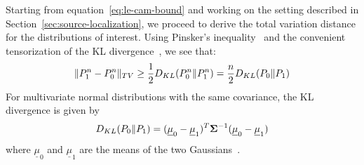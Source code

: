 \documentclass[conference]{IEEEtran}
\providecommand{\v}{}
\renewcommand{\v}[1]{\underline{#1}}
\providecommand{\m}{}
\renewcommand{\m}[1]{{\bf #1}}
\DeclarePairedDelimiter\norm{\lVert}{\rVert}
\begin{document}
\begin{IEEEproof}
Starting from equation~\eqref{eq:le-cam-bound} and working on the setting
described in Section~\ref{sec:source-localization}, we proceed to derive the
total variation distance for the distributions of interest. Using Pinsker's
inequality~\cite{Pinsker} and the convenient tensorization of the KL
divergence~\cite{tensorization}, we see that:
\begin{equation} \label{eq:pinsker-tensorization}
	\norm{P_1^n - P_0^n}_{TV} \geq \frac{1}{2} D_{KL}(P_0^n \Vert P_1^n) = \frac{n}{2} D_{KL}(P_0 \Vert P_1)
\end{equation}
For multivariate normal distributions with the same covariance, the KL
divergence is given by
\begin{equation} \label{eq:kl-div-normal}
	D_{KL}(P_0 \Vert P_1) = (\v \mu_0 - \v \mu_1)^T \m \Sigma^{-1} (\v \mu_0 - \v \mu_1)
\end{equation}
where $\v \mu_0$ and $\v \mu_1$ are the means of the two Gaussians~\cite{KLDivNormal}.


\end{IEEEproof}
\end{document}
